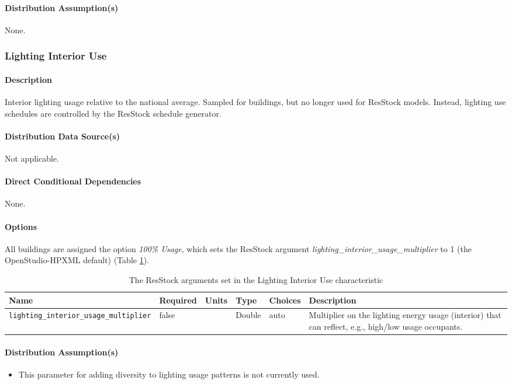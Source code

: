 \paragraph{Distribution Assumption(s)}
None. 

\subsubsection{Lighting Interior Use}\label{lighting_interior_use}
\paragraph{Description}
Interior lighting usage relative to the national average. Sampled for buildings, but no longer used for ResStock models. Instead, lighting use schedules are controlled by the ResStock schedule generator. 
\paragraph{Distribution Data Source(s)}
Not applicable. 
\paragraph{Direct Conditional Dependencies}
None. 
\paragraph{Options}
All buildings are assigned the option \textit{100\% Usage}, which sets the ResStock argument \textit{lighting\_interior\_usage\_multiplier} to 1 (the OpenStudio-HPXML default) (Table \ref{table:hc_arg_def_light_int_use}).


\begin{longtable}[]{ |p{3.5cm}|p{1.5cm}|p{1cm}|p{1.1cm}|p{1.4cm}|p{5.5cm}|} \caption{The ResStock arguments set in the Lighting Interior Use characteristic} \label{table:hc_arg_def_light_int_use}  \\
\toprule\noalign{}
Name & Required & Units & Type & Choices & Description \\
\midrule\noalign{}
\endhead
\bottomrule\noalign{}
\endlastfoot
\texttt{lighting\_interior\_usage\_multiplier} & false & & Double & auto
& Multiplier on the lighting energy usage (interior) that can reflect,
e.g., high/low usage occupants.  \\
\end{longtable}

\paragraph{Distribution Assumption(s)}
\begin{itemize}
 \item
  This parameter for adding diversity to lighting usage patterns is not
  currently used.
\end{itemize}

